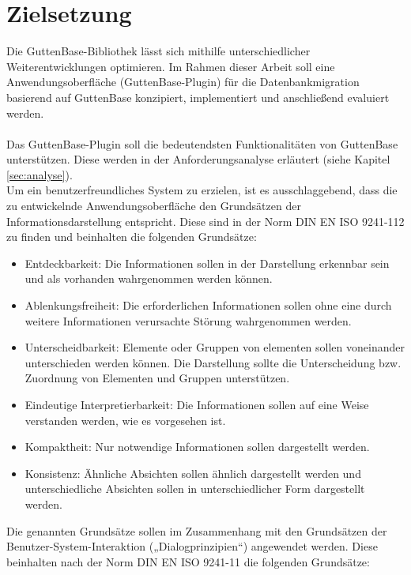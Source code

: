 \section{Zielsetzung}
\label{sec:ziel}
Die GuttenBase-Bibliothek lässt sich mithilfe unterschiedlicher Weiterentwicklungen optimieren. 
Im Rahmen dieser Arbeit soll eine Anwendungsoberfläche (GuttenBase-Plugin) für die Datenbankmigration basierend auf GuttenBase konzipiert, implementiert und anschließend evaluiert werden. \\ \\
Das GuttenBase-Plugin soll die bedeutendsten Funktionalitäten von GuttenBase unterstützen. Diese werden in der Anforderungsanalyse erläutert (siehe Kapitel \ref{sec:analyse}).\\
Um ein benutzerfreundliches System zu erzielen, ist es ausschlaggebend, dass die zu entwickelnde Anwendungsoberfläche den Grundsätzen der Informationsdarstellung entspricht. Diese sind in der Norm DIN EN ISO 9241-112 zu finden und beinhalten die folgenden Grundsätze:
\begin{itemize}
	\item Entdeckbarkeit: 
	Die Informationen sollen in der Darstellung erkennbar sein und als vorhanden wahrgenommen werden können.
	
	\item Ablenkungsfreiheit: 
	Die erforderlichen Informationen sollen ohne eine durch weitere Informationen verursachte Störung wahrgenommen werden.
	
	\item Unterscheidbarkeit: 
	Elemente oder Gruppen von elementen sollen voneinander unterschieden werden können. Die Darstellung sollte die Unterscheidung bzw. Zuordnung von Elementen und Gruppen unterstützen.
	
	\item Eindeutige Interpretierbarkeit:
	Die Informationen sollen auf eine Weise verstanden werden, wie es vorgesehen ist.
	
	\item Kompaktheit:
	Nur notwendige Informationen sollen dargestellt werden.
	
	\item Konsistenz:
	Ähnliche Absichten sollen ähnlich dargestellt werden und unterschiedliche Absichten sollen in unterschiedlicher Form dargestellt werden.
	
\end{itemize}
Die genannten Grundsätze sollen im Zusammenhang mit den Grundsätzen der Benutzer-System-Interaktion („Dialogprinzipien“) angewendet werden. Diese beinhalten nach der Norm DIN EN ISO 9241-11 die folgenden Grundsätze:

